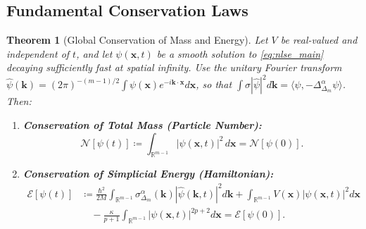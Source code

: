 \documentclass[11pt,a4paper]{article}
\theoremstyle{plain}
\newtheorem{theorem}{Theorem}[section]
\theoremstyle{definition}
\theoremstyle{remark}
\numberwithin{equation}{section}
\begin{document}
\subsection{Fundamental Conservation Laws}

\begin{theorem}[Global Conservation of Mass and Energy]
\label{thm:nlse_conservation}
Let $V$ be real-valued and independent of $t$, and let $\psi(\mathbf{x}, t)$ be a smooth solution to \eqref{eq:nlse_main} decaying sufficiently fast at spatial infinity. Use the unitary Fourier transform $\widehat{\psi}(\mathbf{k}) = (2\pi)^{-(m-1)/2}\int \psi(\mathbf{x})e^{-i\mathbf{k}\cdot\mathbf{x}}d\mathbf{x}$, so that $\int \sigma |\widehat\psi|^2 d\mathbf{k} = \langle \psi, -\Delta^\alpha_{\Delta_m}\psi\rangle$. Then:
\begin{enumerate}
    \item \textbf{Conservation of Total Mass (Particle Number):}
    \begin{equation}
    \mathcal{N}[\psi(t)] \coloneqq \int_{\mathbb{R}^{m-1}} |\psi(\mathbf{x}, t)|^2 \, d\mathbf{x} = \mathcal{N}[\psi(0)].
    \end{equation}
    \item \textbf{Conservation of Simplicial Energy (Hamiltonian):}
    \begin{align}
    \mathcal{E}[\psi(t)] &\coloneqq \frac{\hbar^2}{2M}\int_{\mathbb{R}^{m-1}} \sigma_{\Delta_m}^\alpha(\mathbf{k}) |\widehat{\psi}(\mathbf{k}, t)|^2 d\mathbf{k} + \int_{\mathbb{R}^{m-1}} V(\mathbf{x})|\psi(\mathbf{x}, t)|^2 d\mathbf{x} \nonumber\\
    &\quad - \frac{\kappa}{p+1}\int_{\mathbb{R}^{m-1}} |\psi(\mathbf{x}, t)|^{2p+2} d\mathbf{x} = \mathcal{E}[\psi(0)].
    \end{align}
\end{enumerate}
\end{theorem}
\end{document}
